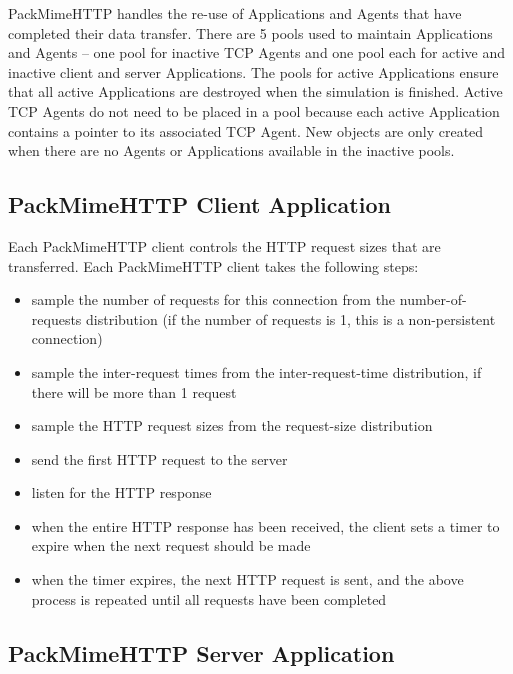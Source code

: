PackMimeHTTP handles the re-use of Applications and Agents that have
completed their data transfer. There are 5 pools used to maintain
Applications and Agents -- one pool for inactive TCP Agents and one
pool each for active and inactive client and server Applications. The
pools for active Applications ensure that all active Applications are
destroyed when the simulation is finished. Active TCP Agents do not
need to be placed in a pool because each active Application contains a
pointer to its associated TCP Agent. New objects are only created when
there are no Agents or Applications available in the inactive pools. 

\subsection{PackMimeHTTP Client Application}

Each PackMimeHTTP client controls the HTTP request sizes that are
transferred. Each PackMimeHTTP client takes the following steps: 
\begin{itemize}
\item{sample the number of requests for this connection from the
number-of-requests distribution (if the number of requests is 1, this
is a non-persistent connection)}
\item{sample the inter-request times from the inter-request-time
distribution, if there will be more than 1 request}
\item{sample the HTTP request sizes from the request-size
distribution}
\item{send the first HTTP request to the server}
\item{listen for the HTTP response}
\item{when the entire HTTP response has been received, the client sets
a timer to expire when the next request should be made}
\item{when the timer expires, the next HTTP request is sent, and the
above process is repeated until all requests have been completed}
\end{itemize}

\subsection{PackMimeHTTP Server Application}

